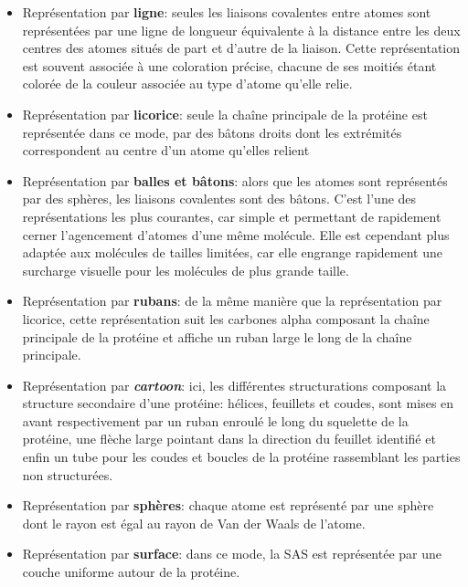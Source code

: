 \begin{itemize}
  \item Représentation par \textbf{ligne}: seules les liaisons covalentes entre atomes sont représentées par une ligne de longueur équivalente à la distance entre les deux centres des atomes situés de part et d'autre de la liaison. Cette représentation est souvent associée à une coloration précise, chacune de ses moitiés étant colorée de la couleur associée au type d'atome qu'elle relie.
  \item Représentation par \textbf{licorice}: seule la chaîne principale de la protéine est représentée dans ce mode, par des bâtons droits dont les extrémités correspondent au centre d'un atome qu'elles relient
  \item Représentation par \textbf{balles et bâtons}: alors que les atomes sont représentés par des sphères, les liaisons covalentes sont des bâtons. C'est l'une des représentations les plus courantes, car simple et permettant de rapidement cerner l'agencement d'atomes d'une même molécule. Elle est cependant plus adaptée aux molécules de tailles limitées, car elle engrange rapidement une surcharge visuelle pour les molécules de plus grande taille.
  \item Représentation par \textbf{rubans}: de la même manière que la représentation par licorice, cette représentation suit les carbones alpha composant la chaîne principale de la protéine et affiche un ruban large le long de la chaîne principale.
  \item Représentation par \textit{\textbf{cartoon}}: ici, les différentes structurations composant la structure secondaire d'une protéine: hélices, feuillets et coudes, sont mises en avant respectivement par un ruban enroulé le long du squelette de la protéine, une flèche large pointant dans la direction du feuillet identifié et enfin un tube pour les coudes et boucles de la protéine rassemblant les parties non structurées.
  \item Représentation par \textbf{sphères}: chaque atome est représenté par une sphère dont le rayon est égal au rayon de Van der Waals de l'atome.
  \item Représentation par \textbf{surface}: dans ce mode, la SAS est représentée par une couche uniforme autour de la protéine.
\end{itemize}

